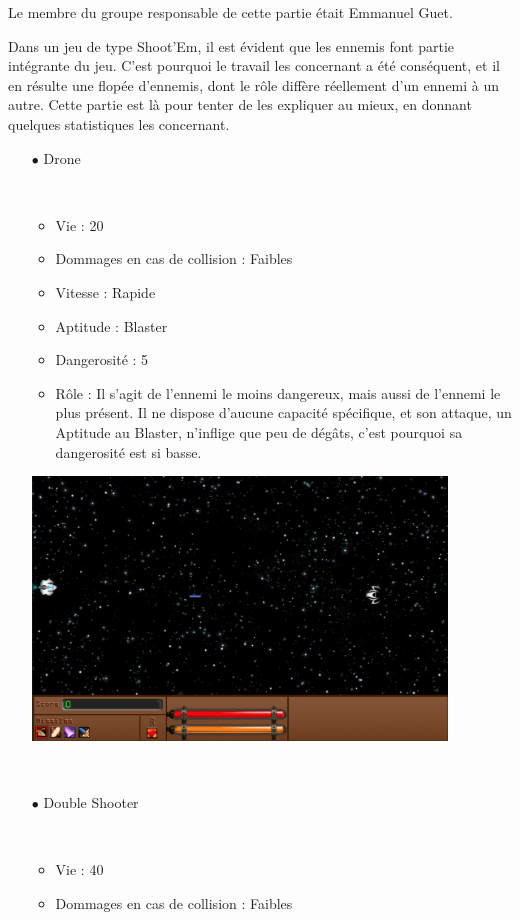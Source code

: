 \par Le membre du groupe responsable de cette partie était Emmanuel Guet.

Dans un jeu de type Shoot'Em, il est évident que les ennemis font partie intégrante du jeu.
C'est pourquoi le travail les concernant a été conséquent, et il en résulte une flopée d'ennemis, dont le rôle diffère réellement d'un ennemi à un autre. Cette partie est là pour tenter de les expliquer au mieux, en donnant quelques statistiques les concernant.

		\begin{itemize}
			\item[$\bullet$ Drone]
				\par~
				\begin{itemize}
					\item Vie : 20
					\item Dommages en cas de collision : Faibles
					\item Vitesse : Rapide
					\item Aptitude : Blaster
					\item Dangerosité : 5%
					\item Rôle : Il s'agit de l'ennemi le moins dangereux, mais aussi de l'ennemi le plus présent. Il ne dispose d'aucune capacité spécifique, et son attaque, un Aptitude au Blaster, n'inflige que peu de dégâts, c'est pourquoi sa dangerosité est si basse.
				\end{itemize}
\includegraphics[width=11cm]{images/vaisseaux/drone.png}
				\par~
			\item[$\bullet$ Double Shooter]
				\par~
				\begin{itemize}
					\item Vie : 40
					\item Dommages en cas de collision : Faibles

\end{itemize}
\end{itemize}

